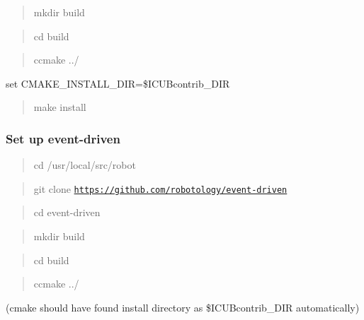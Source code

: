 \begin{quote}
mkdir build \end{quote}


\begin{quote}
cd build \end{quote}


\begin{quote}
ccmake ../ \end{quote}



\begin{DoxyItemize}
\item set C\+M\+A\+K\+E\+\_\+\+I\+N\+S\+T\+A\+L\+L\+\_\+\+D\+IR=\$\+I\+C\+U\+Bcontrib\+\_\+\+D\+IR
\end{DoxyItemize}

\begin{quote}
make install \end{quote}


\subsubsection*{Set up event-\/driven}

\begin{quote}
cd /usr/local/src/robot \end{quote}


\begin{quote}
git clone \href{https://github.com/robotology/event-driven}{\tt https\+://github.\+com/robotology/event-\/driven} \end{quote}


\begin{quote}
cd event-\/driven \end{quote}


\begin{quote}
mkdir build \end{quote}


\begin{quote}
cd build \end{quote}


\begin{quote}
ccmake ../ \end{quote}



\begin{DoxyItemize}
\item (cmake should have found install directory as \$\+I\+C\+U\+Bcontrib\+\_\+\+D\+IR automatically)
\end{DoxyItemize}

